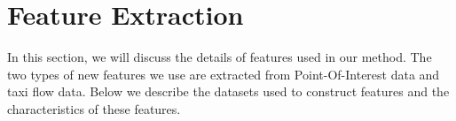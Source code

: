 
\section{Feature Extraction}
\label{sec:feature}

In this section, we will discuss the details of features used in our method. The two types of new features we use are extracted from Point-Of-Interest data and taxi flow data. Below we describe the datasets used to construct features and the characteristics of these features.

\begin{figure}[t]
\centering
{}

\end{figure}
